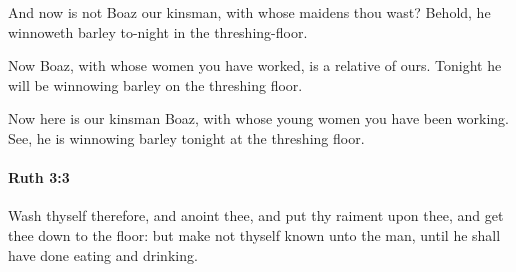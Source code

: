 			\begin{versebox}
					\item[BHS] 
					\item[LXX] 
					\item[ASV] And now is not Boaz our kinsman, with whose maidens thou wast? Behold, he winnoweth barley to-night in the threshing-floor.
					\item[NIV] Now Boaz, with whose women you have worked, is a relative of ours. Tonight he will be winnowing barley on the threshing floor.
					\item[NRSV] Now here is our kinsman Boaz, with whose young women you have been working. See, he is winnowing barley tonight at the threshing floor.
			\end{versebox}

		\paragraph{Ruth 3:3} %
			\label{RUTH-3-3}

			Wash thyself therefore, and anoint thee, and put thy raiment upon thee, and get thee down to the floor: but make not thyself known unto the man, until he shall have done eating and drinking.

